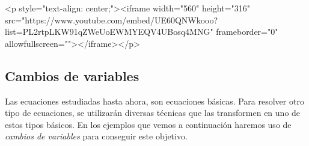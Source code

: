 \begin{rawhtml}
<p style="text-align: center;"><iframe width="560" height="316" src="https://www.youtube.com/embed/UE60QNWkooo?list=PL2rtpLKW91qZWeUoEWMYEQV4UBosq4MNG" frameborder="0" allowfullscreen=""></iframe></p>
\end{rawhtml}

\subsection{Cambios de variables}
\label{ss:cambiosvariable}

Las ecuaciones estudiadas hasta ahora, son ecuaciones básicas.
Para resolver otro tipo de ecuaciones, se utilizarán diversas técnicas que las transformen en uno de estos tipos básicos.
En los ejemplos que vemos a continuación haremos uso de \emph{cambios de variables} para conseguir este objetivo.

